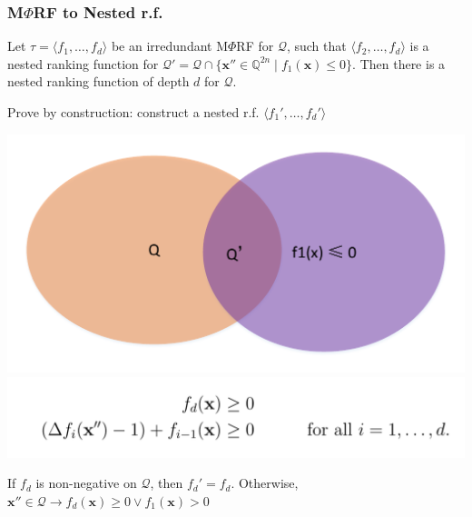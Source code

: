 \documentclass[11pt]{beamer}
\begin{document}
\begin{frame}\frametitle{M$\Phi$RF to Nested r.f.}
\begin{lemma}[1]
Let $\tau = \langle f_1, \ldots, f_d \rangle$ be an irredundant M$\Phi$RF for $\mathcal{Q}$, such that $\langle f_2, \ldots, f_d\rangle$ is a nested ranking function for $\mathcal{Q}' = \mathcal{Q}\cap \{\textbf{x}''\in \mathbb{Q}^{2n}\mid f_1(\textbf{x}) \le 0\}$. Then there is a nested ranking function of depth $d$ for $\mathcal{Q}$.

\end{lemma}
Prove by construction: construct a nested r.f. $\langle f_1', \ldots, f_d'\rangle$
\begin{center}
\includegraphics[scale = 0.3]{1.pdf}
\includegraphics[scale = 0.2]{6.PNG}


\end{center}
If $f_d$ is non-negative on $\mathcal{Q}$, then $f_d' = f_d$.
Otherwise, $\textbf{x}'' \in \mathcal{Q} \rightarrow f_d(\textbf{x}) \ge 0 \vee f_1(\textbf{x}) > 0$


\end{frame}
\end{document}
